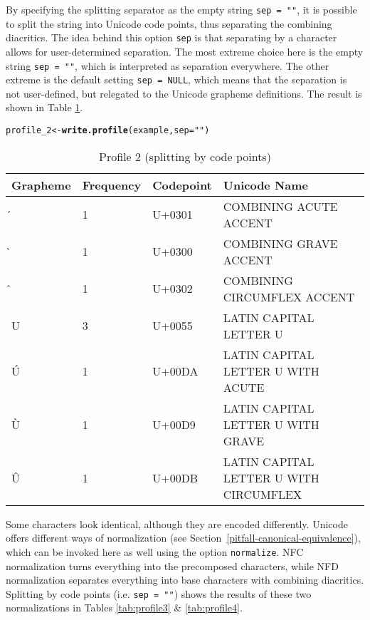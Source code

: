 \documentclass[output=inprep,
		biblatex
		]{LSP/langsci}\usepackage[]{graphicx}\usepackage[]{color}
\makeatletter
\newcommand{\hlstr}[1]{\textcolor[rgb]{0.192,0.494,0.8}{#1}}%
\newcommand{\hlstd}[1]{\textcolor[rgb]{0.345,0.345,0.345}{#1}}%
\newcommand{\hlkwb}[1]{\textcolor[rgb]{0.69,0.353,0.396}{#1}}%
\newcommand{\hlkwc}[1]{\textcolor[rgb]{0.333,0.667,0.333}{#1}}%
\newcommand{\hlkwd}[1]{\textcolor[rgb]{0.737,0.353,0.396}{\textbf{#1}}}%
\newenvironment{kframe}{%
 \def\at@end@of@kframe{}%
 \ifinner\ifhmode%
  \def\at@end@of@kframe{\end{minipage}}%
  \begin{minipage}{\columnwidth}%
 \fi\fi%
 \def\FrameCommand##1{\hskip\@totalleftmargin \hskip-\fboxsep
 \colorbox{shadecolor}{##1}\hskip-\fboxsep
     \hskip-\linewidth \hskip-\@totalleftmargin \hskip\columnwidth}%
 \MakeFramed {\advance\hsize-\width
   \@totalleftmargin\z@ \linewidth\hsize
   \@setminipage}}%
 {\par\unskip\endMakeFramed%
 \at@end@of@kframe}
\newenvironment{knitrout}{}{} %
\makeatother
\begin{document}
By specifying the splitting separator as the empty string
\texttt{sep~=~""}, it is possible to split the string into Unicode code points,
thus separating the combining diacritics. The idea behind this option
\texttt{sep} is that separating by a character allows for user-determined
separation. The most extreme choice here is the empty string \texttt{sep~=~""},
which is interpreted as separation everywhere. The other extreme is the default
setting \texttt{sep~=~NULL}, which means that the separation is not
user-defined, but relegated to the Unicode grapheme definitions. The result is 
shown in Table \ref{tab:profile2}.

\begin{knitrout}\footnotesize
{}\color{fgcolor}\begin{kframe}
\begin{alltt}
\hlstd{profile_2} \hlkwb{<-} \hlkwd{write.profile}\hlstd{(example,} \hlkwc{sep} \hlstd{=} \hlstr{""}\hlstd{)}
\end{alltt}
\end{kframe}
\end{knitrout}

\begin{table}[H]
\centering
\begingroup\scriptsize
\begin{tabular}{llll}
  \toprule
Grapheme & Frequency & Codepoint & Unicode Name \\ 
  \midrule
́ & 1 & U+0301 & COMBINING ACUTE ACCENT \\ 
  ̀ & 1 & U+0300 & COMBINING GRAVE ACCENT \\ 
  ̂ & 1 & U+0302 & COMBINING CIRCUMFLEX ACCENT \\ 
  U & 3 & U+0055 & LATIN CAPITAL LETTER U \\ 
  Ú & 1 & U+00DA & LATIN CAPITAL LETTER U WITH ACUTE \\ 
  Ù & 1 & U+00D9 & LATIN CAPITAL LETTER U WITH GRAVE \\ 
  Û & 1 & U+00DB & LATIN CAPITAL LETTER U WITH CIRCUMFLEX \\ 
   \bottomrule
\end{tabular}
\endgroup
\caption{Profile 2 (splitting by code points)} 
\label{tab:profile2}
\end{table}


Some characters look identical, although they are encoded differently.
Unicode offers different ways of normalization (see
Section~\ref{pitfall-canonical-equivalence}), which can be invoked here as well
using the option \texttt{normalize}. NFC normalization turns everything into the
precomposed characters, while NFD normalization separates everything into base
characters with combining diacritics. Splitting by code points (i.e. \texttt{sep~=~""}) 
shows the results of these two normalizations in Tables \ref{tab:profile3} \& \ref{tab:profile4}.
\end{document}
